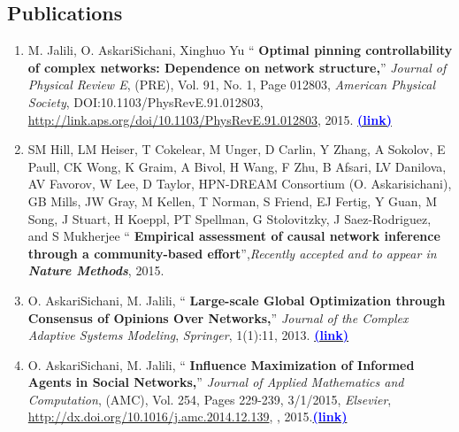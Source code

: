 \documentclass[letter]{res}
\begin{document}
\begin{resume}
\section{Publications}
\begin{enumerate}
\item M. Jalili, O. AskariSichani, Xinghuo Yu `` \textbf{Optimal pinning
controllability of complex networks: Dependence on network structure,}''
\textit{Journal of Physical Review E}, (PRE), Vol. 91, No. 1, Page 012803,
\textit{American Physical Society}, DOI:10.1103/PhysRevE.91.012803,\\
\href{http://link.aps.org/doi/10.1103/PhysRevE.91.012803}{http://link.aps.org/doi/10.1103/PhysRevE.91.012803}, 2015.
{\href{http://ce.sharif.edu/~oaskari/publications/finding_controlnodes.pdf}{\textbf{\textcolor{blue}{(link)}}}}

\item SM Hill, LM Heiser, T Cokelear, M Unger, D Carlin, Y Zhang, A Sokolov, E Paull, CK Wong, K Graim, A Bivol, H Wang, F Zhu, B Afsari, LV Danilova, AV Favorov, W Lee, D Taylor, HPN-DREAM Consortium (O. Askarisichani), GB Mills, JW Gray, M Kellen, T Norman, S Friend, EJ Fertig, Y Guan, M Song, J Stuart, H Koeppl, PT Spellman, G Stolovitzky, J Saez-Rodriguez, and S Mukherjee `` \textbf{Empirical assessment of causal network inference through a community-based effort}'',\textit{Recently accepted and to appear in \textbf{Nature Methods}}, 2015.

\item O. AskariSichani, M. Jalili, `` \textbf{Large-scale Global
Optimization through Consensus of Opinions Over Networks,}'' \textit{Journal of
the Complex Adaptive Systems Modeling}, \textit{Springer}, 1(1):11, 2013.
{\href{http://ce.sharif.edu/~oaskari/publications/large-scale_optimization.pdf}
{\textbf{\textcolor{blue}{(link)}}}}

\item O. AskariSichani, M. Jalili, `` \textbf{Influence Maximization of
Informed Agents in Social Networks,}'' \textit{Journal of Applied Mathematics
and Computation}, (AMC), Vol. 254, Pages 229-239, 3/1/2015, \textit{Elsevier},
\href{http://dx.doi.org/10.1016/j.amc.2014.12.139}{http://dx.doi.org/10.1016/j.amc.2014.12.139},%
, 2015.{\href{http://ce.sharif.edu/~oaskari/publications/influence_maximization.pdf}{\textbf{\textcolor{blue}{(link)}}}}


\end{enumerate}
\end{resume}
\end{document}

